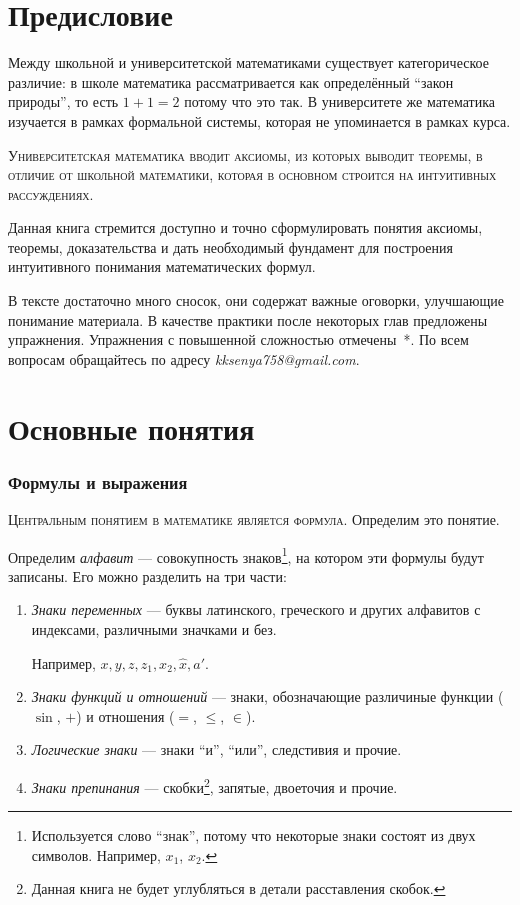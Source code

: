 \part{Предисловие}

Между школьной и университетской математиками существует категорическое
различие: в школе математика рассматривается как определённый ``закон природы'',
то есть $1+1=2$ потому что это так. В университете же математика изучается
в рамках формальной системы, которая не упоминается в рамках курса.

\textsc{Университетская математика вводит аксиомы, из которых выводит теоремы,
	в отличие от школьной математики, которая
	в основном строится на интуитивных рассуждениях.}

Данная книга стремится доступно и точно сформулировать понятия аксиомы,
теоремы, доказательства и дать необходимый фундамент для построения
интуитивного понимания математических формул.

В тексте достаточно много сносок, они содержат важные оговорки,
улучшающие понимание материала. В качестве практики
после некоторых глав предложены упражнения. Упражнения с повышенной сложностью
отмечены~*.
По всем вопросам обращайтесь по адресу {\sl kksenya758@gmail.com}.

\part{Основные понятия}

\section{Формулы и выражения}

\textsc{Центральным понятием в математике является формула.}
Определим это понятие.

Определим {\it алфавит} --- совокупность знаков\footnote{
	Используется слово ``знак'', потому что некоторые знаки
	состоят из двух символов. Например, $x_1$, $x_2$.
}, на котором эти
формулы будут записаны. Его можно разделить на три части:
\begin{enumerate}
	\item{}{\it Знаки переменных} --- буквы латинского,
	греческого и других алфавитов с индексами, различными значками и без.

	Например, $x,y,z,z_1,x_2,\hat x,a'$.

	\item{}{\it Знаки функций и отношений} --- знаки, обозначающие
	различиные функции ($\sin$, $+$) и отношения ($=$, $\leq$, $\in$).

	\item{}{\it Логические знаки} --- знаки ``и'', ``или'', следстивия и прочие.

	\item{}{\it Знаки препинания} --- скобки\footnote{
		Данная книга не будет углубляться в детали расставления скобок.
	}, запятые, двоеточия и прочие.
\end{enumerate}

